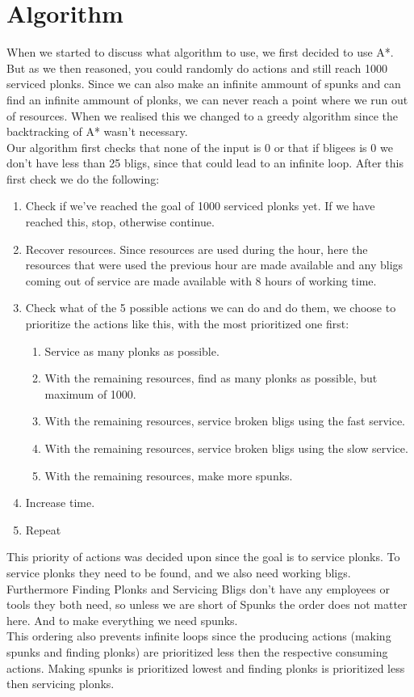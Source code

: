 \documentclass{article}
\begin{document}
\section*{Algorithm}
When we started to discuss what algorithm to use, we first decided to use A*. But as we then reasoned, you could randomly do actions and still reach 1000 serviced plonks. Since we can also make an infinite ammount of spunks and can find an infinite ammount of plonks, we can never reach a point where we run out of resources. When we realised this we changed to a greedy algorithm since the backtracking of A* wasn't necessary.
\\[2ex]
Our algorithm first checks that none of the input is 0 or that if bligees is 0 we don't have less than 25 bligs, since that could lead to an infinite loop. After this first check we do the following:
\begin{enumerate}
	\item Check if we've reached the goal of 1000 serviced plonks yet. If we have reached this, stop, otherwise continue.
	\item Recover resources. Since resources are used during the hour, here the resources that were used the previous hour are made available and any bligs coming out of service are made available with 8 hours of working time.
	\item Check what of the 5 possible actions we can do and do them, we choose to prioritize the actions like this, with the most prioritized one first:
	\begin{enumerate}
		\item Service as many plonks as possible.
		\item With the remaining resources, find as many plonks as possible, but maximum of 1000.
		\item With the remaining resources, service broken bligs using the fast service.
		\item With the remaining resources, service broken bligs using the slow service.
		\item With the remaining resources, make more spunks.
	\end{enumerate}
	\item Increase time.
	\item Repeat
\end{enumerate}

This priority of actions was decided upon since the goal is to service plonks. To service plonks they need to be found, and we also need working bligs. Furthermore Finding Plonks and Servicing Bligs don't have any employees or tools they both need, so unless we are short of Spunks the order does not matter here. And to make everything we need spunks.
\\[2ex]
This ordering also prevents infinite loops since the producing actions (making spunks and finding plonks) are prioritized less then the respective consuming actions. Making spunks is prioritized lowest and finding plonks is prioritized less then servicing plonks.
\end{document}
